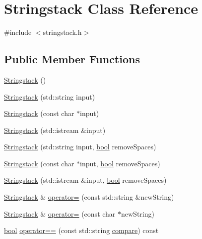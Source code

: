 \hypertarget{classStringstack}{\section{Stringstack Class Reference}
\label{classStringstack}
}


{\ttfamily \#include $<$stringstack.\-h$>$}

\subsection*{Public Member Functions}
\begin{DoxyCompactItemize}
\item 
\hyperlink{classStringstack_afab20605ad4777f27403444335a958a6}{Stringstack} ()
\item 
\hyperlink{classStringstack_aad1e45b6c7f4992135b1eff99c4fb96b}{Stringstack} (std\-::string input)
\item 
\hyperlink{classStringstack_a6951276915a18f6581fa2fe1f233130f}{Stringstack} (const char $\ast$input)
\item 
\hyperlink{classStringstack_a340cb8b0e983570d65548a6c49736569}{Stringstack} (std\-::istream \&input)
\item 
\hyperlink{classStringstack_a964c8db56fa0bc1337fbde2c11456fdc}{Stringstack} (std\-::string input, \hyperlink{structs_8h_ad5c9d4ba3dc37783a528b0925dc981a0}{bool} remove\-Spaces)
\item 
\hyperlink{classStringstack_af26bb77483c372e9c27d145e1cfe4f8d}{Stringstack} (const char $\ast$input, \hyperlink{structs_8h_ad5c9d4ba3dc37783a528b0925dc981a0}{bool} remove\-Spaces)
\item 
\hyperlink{classStringstack_a60d383777a7789d2a3d7f6b901a755da}{Stringstack} (std\-::istream \&input, \hyperlink{structs_8h_ad5c9d4ba3dc37783a528b0925dc981a0}{bool} remove\-Spaces)
\item 
\hyperlink{classStringstack}{Stringstack} \& \hyperlink{classStringstack_a2197bda2738d2f687f4b90575b1bf7e1}{operator=} (const std\-::string \&new\-String)
\item 
\hyperlink{classStringstack}{Stringstack} \& \hyperlink{classStringstack_ab46ad119cb84606eaed0654bde436542}{operator=} (const char $\ast$new\-String)
\item 
\hyperlink{structs_8h_ad5c9d4ba3dc37783a528b0925dc981a0}{bool} \hyperlink{classStringstack_a8afc987bc55cf92fcf9eadcbb8c978b8}{operator==} (const std\-::string \hyperlink{classStringstack_a3a92a82a838b77bedc268372e8fe7a41}{compare}) const 

\end{DoxyCompactItemize}
